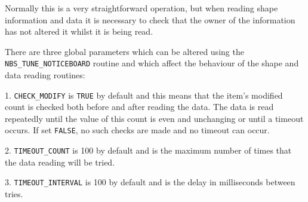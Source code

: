 \documentclass[twoside,11pt,nolof]{starlink}
\begin{document}
      Normally this is a very straightforward operation, but when reading
      shape information and data it is necessary to check that the owner of
      the information has not altered it whilst it is being read.

      There are three global parameters which can be altered using the
      {\texttt{NBS\_TUNE\_NOTICEBOARD}} routine and which affect the behaviour %
of the
      shape and data reading routines:

      1. {\texttt{CHECK\_MODIFY}} is {\texttt{TRUE}} by default and this means %
that the item's
         modified count is checked both before and after reading the data. The
         data is read repeatedly until the value of this count is even and
         unchanging or until a timeout occurs. If set {\texttt{FALSE}}, no %
such checks are
         made and no timeout can occur.

      2. {\texttt{TIMEOUT\_COUNT}} is 100 by default and is the maximum number %
of times
         that the data reading will be tried.

      3. {\texttt{TIMEOUT\_INTERVAL}} is 100 by default and is the delay in %
milliseconds
         between tries.
\end{document}
